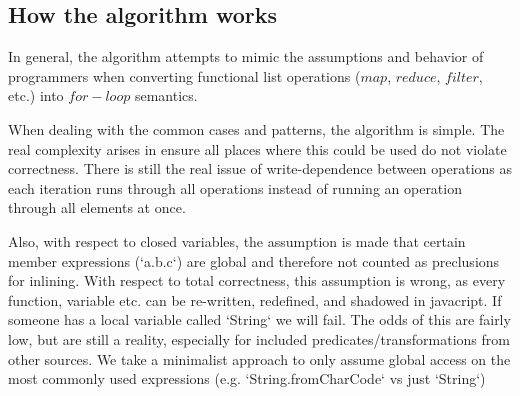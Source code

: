 \subsection{How the algorithm works}
In general, the algorithm attempts to mimic the assumptions and behavior of programmers when converting functional list operations ($map$, $reduce$, $filter$, etc.) into $for-loop$ semantics.

When dealing with the common cases and patterns, the algorithm is simple.  The real complexity arises in ensure all places where this could be used do not violate correctness.  There is still the real issue of write-dependence between operations as each iteration runs through all operations instead of running an operation through all elements at once.

Also, with respect to closed variables, the assumption is made that certain member expressions (`a.b.c`) are  global and therefore not counted as preclusions for inlining.  With respect to total correctness, this assumption is wrong, as every function, variable etc. can be re-written, redefined, and shadowed in javacript.  If someone has a local variable called `String` we will fail.  The odds of this are fairly low, but are still a reality, especially for included predicates/transformations from other sources.  We take a minimalist approach to only assume global access on the most commonly used expressions (e.g. `String.fromCharCode` vs just `String`)